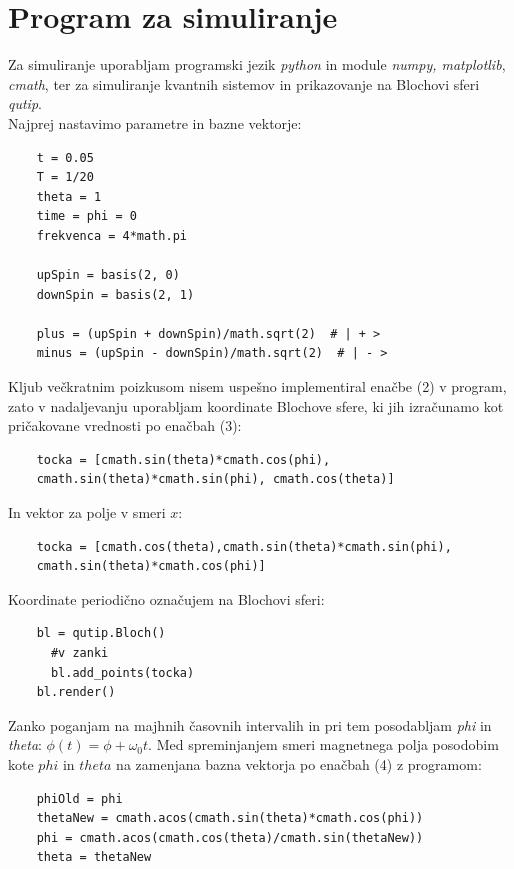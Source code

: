 \documentclass[12pt, a4paper]{article}
\begin{document}
\section{Program za simuliranje}
Za simuliranje uporabljam programski jezik \textit{python} in module \textit{numpy, matplotlib}, \textit{cmath}, ter za simuliranje kvantnih sistemov in prikazovanje na Blochovi sferi \textit{qutip}.\\
Najprej nastavimo parametre in bazne vektorje:
\lstset{language=Python} 
\begin{verbatim}
	t = 0.05
	T = 1/20
	theta = 1
	time = phi = 0
	frekvenca = 4*math.pi 

	upSpin = basis(2, 0)
	downSpin = basis(2, 1)

	plus = (upSpin + downSpin)/math.sqrt(2)  # | + >
	minus = (upSpin - downSpin)/math.sqrt(2)  # | - >
\end{verbatim}
Kljub večkratnim poizkusom nisem uspešno implementiral enačbe (2) v program, zato v nadaljevanju uporabljam koordinate Blochove sfere, ki jih izračunamo kot pričakovane vrednosti po enačbah (3):
\begin{verbatim}
	tocka = [cmath.sin(theta)*cmath.cos(phi), 
	cmath.sin(theta)*cmath.sin(phi), cmath.cos(theta)]
\end{verbatim}
In vektor za polje v smeri $x$:
\begin{verbatim}
	tocka = [cmath.cos(theta),cmath.sin(theta)*cmath.sin(phi),
	cmath.sin(theta)*cmath.cos(phi)]
\end{verbatim}
Koordinate periodično označujem na Blochovi sferi:
\begin{verbatim}
	bl = qutip.Bloch()
	  #v zanki	
	  bl.add_points(tocka)
	bl.render() 
\end{verbatim}
Zanko poganjam na majhnih časovnih intervalih in pri tem posodabljam \textit{phi} in \textit{theta}: $\phi(t) = \phi + \omega_0t$.
Med spreminjanjem smeri magnetnega polja posodobim kote $phi$ in $theta$ na zamenjana bazna vektorja po enačbah (4) z programom:
\begin{verbatim}
	phiOld = phi
	thetaNew = cmath.acos(cmath.sin(theta)*cmath.cos(phi))
	phi = cmath.acos(cmath.cos(theta)/cmath.sin(thetaNew))
	theta = thetaNew
\end{verbatim}
\end{document}
